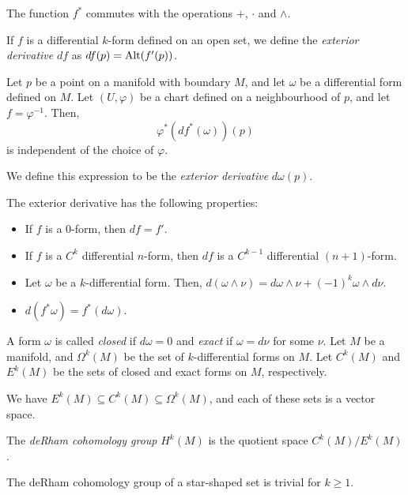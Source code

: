 \begin{prop}
    The function $f^*$ commutes with the operations $+$, $\cdot$ and $\wedge$.
\end{prop}
\begin{defn}
    If $f$ is a differential $k$-form defined on an open set, we define the
    \emph{exterior derivative} $df$ as $df(p)=\mathrm{Alt}(f'(p))$.
\end{defn}
\begin{prop}
    Let $p$ be a point on a manifold with boundary $M$, and let $\omega$ be a differential
    form defined on $M$. Let $(U,\varphi)$ be a chart defined on a neighbourhood of
    $p$, and let $f=\varphi^{-1}$. Then,
    \[\varphi^*(df^*(\omega))(p)\] is independent of the choice of $\varphi$.
\end{prop}
\begin{defn}
    We define this expression to be the \emph{exterior derivative} $d\omega(p)$.
\end{defn}
\begin{prop}
    The exterior derivative has the following properties:
    \begin{itemize}
        \item If $f$ is a $0$-form, then $df=f'$.
        \item If $f$ is a $C^k$ differential $n$-form, then $df$ is a $C^{k-1}$
            differential $(n+1)$-form.
        \item Let $\omega$ be a $k$-differential form. Then,
            $d(\omega\wedge\nu)=d\omega\wedge\nu+(-1)^k\omega\wedge d\nu$.
        \item $d(f^*\omega)=f^*(d\omega)$.
    \end{itemize}
\end{prop}
\begin{defn}
    A form $\omega$ is called \emph{closed} if $d\omega=0$ and \emph{exact} if
    $\omega=d\nu$ for some $\nu$.
    Let $M$ be a manifold, and $\Omega^k(M)$ be the set of $k$-differential forms
    on $M$. Let $C^k(M)$ and $E^k(M)$ be the sets of closed and exact forms on
    $M$, respectively.
\end{defn}
\begin{prop}
    We have $E^k(M)\subseteq C^k(M)\subseteq\Omega^k(M)$, and each of these sets
    is a vector space.
\end{prop}
\begin{defn}
    The \emph{deRham cohomology group} $H^k(M)$ is the
    quotient space $C^k(M)/E^k(M)$.
\end{defn}
\begin{thm}
    The deRham cohomology group of a star-shaped set is trivial for $k\ge 1$.
\end{thm}
